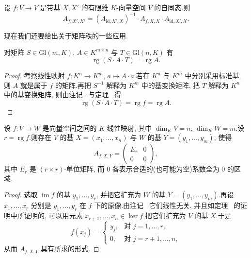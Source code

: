 \begin{corollary}\label{cor:3.4.5}
设 $f \colon V \longrightarrow V$ 是带基 $X, X'$ 的有限维 $K$-向量空间 $V$ 的自同态.则
\[
A_{f, X', X'} = (A_{\mathrm{id}, X', X})^{-1} \cdot A_{f, X, X} \cdot A_{\mathrm{id}, X', X}\text{.}
\]
\end{corollary}

现在我们还要给出关于矩阵秩的一些应用.

\begin{theorem}\label{thm:3.4.6}
对矩阵 $S \in \mathrm{Gl}(m, K)$, $A \in K^{m \times n}$ 与 $T \in \mathrm{Gl}(n, K)$ 有
\[
\operatorname{rg}(S \cdot A \cdot T) = \operatorname{rg} A\text{.}
\]
\end{theorem}

\begin{proof}
考察线性映射 $f \colon K^n \longrightarrow K^m$, $a \longmapsto A \cdot a$.若在 $K^n$ 与 $K^m$ 中分别采用标准基, 则 $A$ 就是属于 $f$ 的矩阵.再把 $S^{-1}$ 解释为 $K^m$ 中的基变换矩阵, 把 $T$ 解释为 $K^n$ 中的基变换矩阵, 则由注记~ 与定理~ 得
\[
\operatorname{rg}(S \cdot A \cdot T) = \operatorname{rg} f = \operatorname{rg} A\text{.}
\]
\end{proof}

\begin{lemma}\label{lem:3.4.7}
设 $f \colon V \longrightarrow W$ 是向量空间之间的 $K$-线性映射, 其中 $\dim_K V = n$, $\dim_K W = m$.设 $r = \operatorname{rg} f$.则存在 $V$ 的基 $X = (x_1, \ldots, x_n)$ 与 $W$ 的基 $Y = (y_1, \ldots, y_m)$, 使得
\[
A_{f, X, Y} = \begin{pmatrix} E_r & 0 \\ 0 & 0 \end{pmatrix},
\]
其中 $E_r$ 是 $(r \times r)$-单位矩阵, 而 $0$ 各表示合适的(也可能为空)系数全为 $0$ 的区域.
\end{lemma}

\begin{proof}
选取 $\operatorname{im} f$ 的基 $y_1, \ldots, y_r$, 并把它扩充为 $W$ 的基 $Y = (y_1, \ldots, y_m)$.再设 $x_1, \ldots, x_r$ 分别是 $y_1, \ldots, y_r$ 在 $f$ 下的原像.由注记~ 它们线性无关, 并且如定理~ 的证明中所证明的, 可以用元素 $x_{r + 1}, \ldots, x_n \in \ker f$ 把它们扩充为 $V$ 的基 $X$.于是
\[
f(x_j) = \begin{cases}
y_j, & \text{对 } j = 1, \ldots, r, \\
0, & \text{对 } j = r + 1, \ldots, n,
\end{cases}
\]
从而 $A_{f, X, Y}$ 具有所求的形式.
\end{proof}


